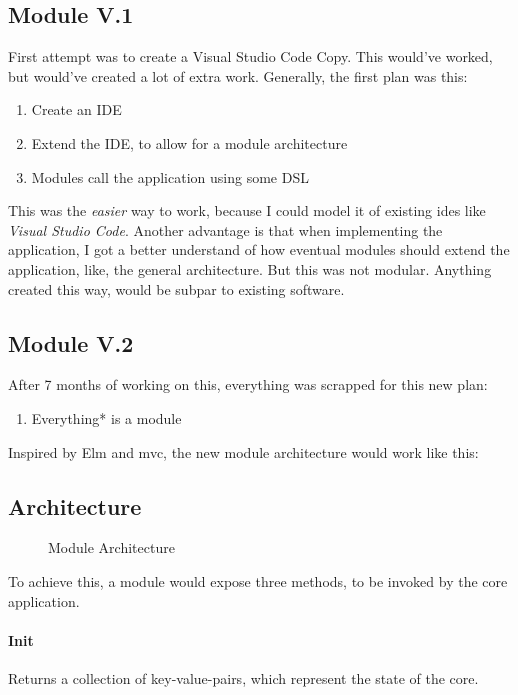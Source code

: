 \subsection{Module V.1}

First attempt was to create a Visual Studio Code Copy. This would've worked, but
would've created a lot of extra work.
Generally, the first plan was this:
\begin{enumerate}
  \item Create an IDE
  \item Extend the IDE, to allow for a module architecture
  \item Modules call the application using some DSL
\end{enumerate}

This was the \textit{easier} way to work, because I could model it of existing
\glspl{ide} like \textit{Visual Studio Code}. Another advantage is that when
implementing the application, I got a better understand of how eventual modules
should extend the application, like, the general architecture. But this was not
modular. Anything created this way, would be subpar to existing software.

\subsection{Module V.2}

After 7  months of working on this, everything was scrapped for this new plan:
\begin{enumerate}
  \item Everything* is a module
\end{enumerate}

Inspired by Elm and \gls{mvc}, the new module architecture would work like this:

\subsection{Architecture}
\begin{figure}
  \centering
  
  \caption{Module Architecture}
\end{figure}

To achieve this, a module would expose three methods, to be invoked by the core
application.

\paragraph{Init} Returns a collection of key-value-pairs, which represent
the state of the core.

